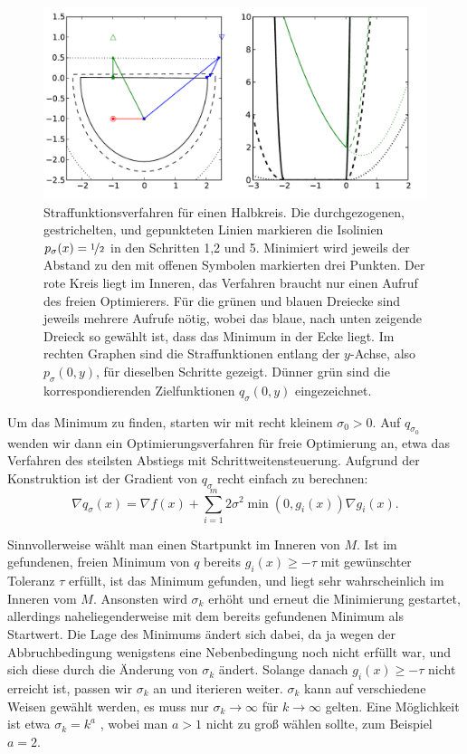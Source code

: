 \begin{figure}
  \centering
  \includegraphics[width=\textwidth]{plots/penalty}
  \caption{Straffunktionsverfahren für einen Halbkreis. Die
    durchgezogenen, gestrichelten, und gepunkteten Linien markieren
    die Isolinien $p_{\sigma}(x)=\nicefrac{1}{2}$ in den Schritten 1,2
    und 5. Minimiert wird jeweils der Abstand zu den mit offenen
    Symbolen markierten drei Punkten. Der rote Kreis liegt im Inneren,
    das Verfahren braucht nur einen Aufruf des freien Optimierers. Für
    die grünen und blauen Dreiecke sind jeweils mehrere Aufrufe nötig,
    wobei das blaue, nach unten zeigende Dreieck so gewählt ist, dass
    das Minimum in der Ecke liegt. Im rechten Graphen sind die
    Straffunktionen entlang der $y$-Achse, also $p_{\sigma}(0,y)$, für
    dieselben Schritte gezeigt. Dünner grün sind die korrespondierenden
    Zielfunktionen $q_{\sigma}(0,y)$ eingezeichnet.}
  \label{fig:penalty}
\end{figure}

Um das Minimum zu finden, starten wir mit recht kleinem
$\sigma_0>0$. Auf $q_{\sigma_0}$ wenden wir dann ein
Optimierungsverfahren für freie Optimierung an, etwa das Verfahren des
steilsten Abstiegs mit Schrittweitensteuerung. Aufgrund der
Konstruktion ist der Gradient von $q_{\sigma}$ recht einfach zu berechnen:
\begin{equation}
  \nabla q_{\sigma}(x) = \nabla f(x) + \sum_{i=1}^m 2\sigma^2\min(0,
  g_i(x))\nabla g_i(x).
\end{equation}

Sinnvollerweise wählt man einen Startpunkt im Inneren von $M$. Ist im
gefundenen, freien Minimum von $q$ bereits $g_i(x)\ge - \tau$ mit
gewünschter Toleranz $\tau$ erfüllt, ist das Minimum gefunden, und
liegt sehr wahrscheinlich im Inneren vom $M$. Ansonsten wird
$\sigma_k$ erhöht und erneut die Minimierung gestartet, allerdings
naheliegenderweise mit dem bereits gefundenen Minimum als
Startwert. Die Lage des Minimums ändert sich dabei, da ja wegen der
Abbruchbedingung wenigstens eine Nebenbedingung noch nicht erfüllt
war, und sich diese durch die Änderung von $\sigma_k$ ändert. Solange
danach $g_i(x)\ge - \tau$ nicht erreicht ist, passen wir $\sigma_k$ an
und iterieren weiter.
$\sigma_k$ kann auf verschiedene Weisen gewählt werden, es muss nur
$\sigma_k\to \infty$ für $k\to\infty$ gelten. Eine Möglichkeit ist
etwa $\sigma_k=k^a$ , wobei man $a>1$ nicht zu groß wählen sollte, zum
Beispiel $a=2$.

